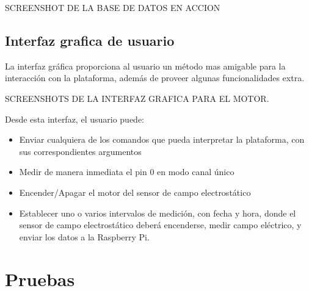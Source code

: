 SCREENSHOT DE LA BASE DE DATOS EN ACCION


\subsection{Interfaz grafica de usuario} %
\label{it7:sub:interfaz_grafica_de_usuario}

La interfaz gráfica proporciona al usuario un método mas amigable para la interacción con la plataforma, además de proveer algunas funcionalidades extra.

SCREENSHOTS DE LA INTERFAZ GRAFICA PARA EL MOTOR.

Desde esta interfaz, el usuario puede:

\begin{itemize}
  \item Enviar cualquiera de los comandos que pueda interpretar la plataforma, con sus correspondientes argumentos
  \item Medir de manera inmediata el pin 0 en modo canal único
  \item Encender/Apagar el motor del sensor de campo electrostático
  \item Establecer uno o varios intervalos de medición, con fecha y hora, donde el sensor de campo electrostático deberá encenderse, medir campo eléctrico, y enviar los datos a la Raspberry Pi.
\end{itemize}




\section{Pruebas} %
\label{it7:sec:pruebas}

